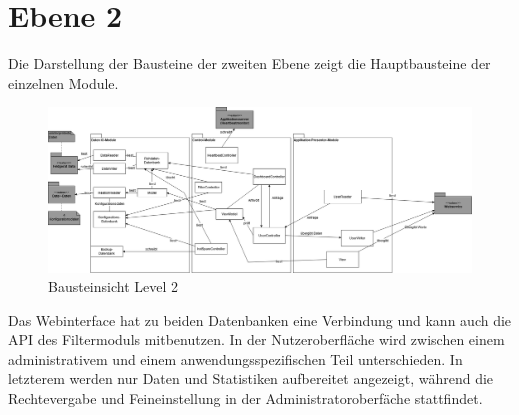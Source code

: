 \section{Ebene 2}
Die Darstellung der Bausteine der zweiten Ebene zeigt die Hauptbausteine der einzelnen Module.
\begin{figure}[h]
	\centering
	\includegraphics[width=1\textwidth]{Graphics/bausteinansicht_ebene_2.png}
	\caption{Bausteinsicht Level 2}
	\label{fig:bausteinsichtlvl2}
\end{figure}
Das Webinterface hat zu beiden Datenbanken eine Verbindung und kann auch die API des Filtermoduls mitbenutzen. In der Nutzeroberfläche wird zwischen einem administrativem und einem anwendungsspezifischen Teil unterschieden. In letzterem werden nur Daten und Statistiken aufbereitet angezeigt, während die Rechtevergabe und Feineinstellung in der Administratoroberfäche stattfindet. 

                 
                 
